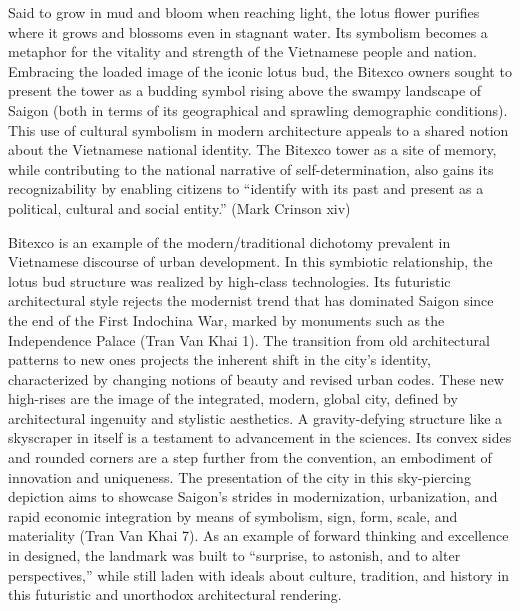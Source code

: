 Said to grow in mud and bloom when reaching light, the lotus flower purifies where it grows and blossoms even in stagnant water. Its symbolism becomes a metaphor for the vitality and strength of the Vietnamese people and nation. Embracing the loaded image of the iconic lotus bud, the Bitexco owners sought to present the tower as a budding symbol rising above the swampy landscape of Saigon (both in terms of its geographical and sprawling demographic conditions). This use of cultural symbolism in modern architecture appeals to a shared notion about the Vietnamese national identity. The Bitexco tower as a site of memory, while contributing to the national narrative of self-determination, also gains its recognizability by enabling citizens to “identify with its past and present as a political, cultural and social entity.” (Mark Crinson xiv)  %

Bitexco is an example of the modern/traditional dichotomy prevalent in Vietnamese discourse of urban development. In this symbiotic relationship, the lotus bud structure was realized by high-class technologies. Its futuristic architectural style rejects the modernist trend that has dominated Saigon since the end of the First Indochina War, marked by monuments such as the Independence Palace (Tran Van Khai 1). The transition from old architectural patterns to new ones projects the inherent shift in the city’s identity, characterized by changing notions of beauty and revised urban codes. These new high-rises are the image of the integrated, modern, global city, defined by architectural ingenuity and stylistic aesthetics. A gravity-defying structure like a skyscraper in itself is a testament to advancement in the sciences. Its convex sides and rounded corners are a step further from the convention, an embodiment of innovation and uniqueness. The presentation of the city in this sky-piercing depiction aims to showcase Saigon’s strides in modernization, urbanization, and rapid economic integration by means of symbolism, sign, form, scale, and materiality (Tran Van Khai 7). As an example of forward thinking and excellence in designed, the landmark was built to “surprise, to astonish, and to alter perspectives,” while still laden with ideals about culture, tradition, and history in this futuristic and unorthodox architectural rendering. %

